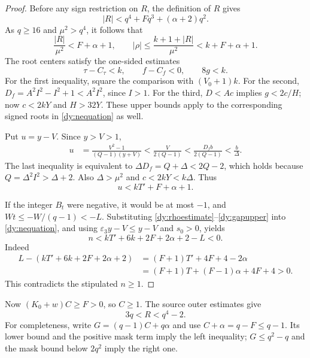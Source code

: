 \begin{proof}
Before any sign restriction on $R$, the definition of $R$ gives
\begin{equation}
 |R|<q^4+Fq^3+(\alpha+2)q^2.
 \label{dy:Rabsolute}
\end{equation}
As $q\ge16$ and $\mu^2>q^4$, it follows that
\begin{equation}
 \frac{|R|}{\mu^2}<F+\alpha+1,\qquad
 |\rho|\le\frac{k+1+|R|}{\mu^2}<k+F+\alpha+1.
 \label{dy:rhoestimate}
\end{equation}
The root centers satisfy the one-sided estimates
\begin{equation}
 \tau-C_\tau<k,\qquad f-C_f<0,\qquad 8g<k.
 \label{dy:rootupper}
\end{equation}
For the first inequality, square the comparison with $(V_0+1)k$.
For the second, $D_f=A^2I^2-I^2+1<A^2I^2$, since $I>1$.
For the third, $D<Ac$ implies $g<2c/H$; now $c<2kY$ and $H>32Y$.
These upper bounds apply to the corresponding signed roots in
\eqref{dy:nequation} as well.

Put $u=y-V$.  Since $y>V>1$,
\begin{align*}
 u&=\frac{V^2-1}{(Q-1)(y+V)}
       <\frac{V}{2(Q-1)}
       <\frac{D_fb}{2(Q-1)}<\frac b\Delta.
\end{align*}
The last inequality is equivalent to
$\Delta D_f=Q+\Delta<2Q-2$, which holds because
$Q=\Delta^2I^2>\Delta+2$.  Also $\Delta>\mu^2$ and
$c<2kY<k\Delta$.  Thus
\begin{equation}
 u<kT'+F+\alpha+1.
 \label{dy:gapupper}
\end{equation}

If the integer $B_t$ were negative, it would be at most $-1$, and
$Wt\le-W/(q-1)<-L$.  Substituting
\eqref{dy:rhoestimate}--\eqref{dy:gapupper} into
\eqref{dy:nequation}, and using
$\varepsilon_3y-V\le y-V$ and $s_0>0$, yields
\[
 n<kT'+6k+2F+2\alpha+2-L<0.
\]
Indeed
\begin{align*}
 L-(kT'+6k+2F+2\alpha+2)
  &=(F+1)T'+4F+4-2\alpha\\
  &=(F+1)T+(F-1)\alpha+4F+4>0.
\end{align*}
This contradicts the stipulated $n\ge1$.
\end{proof}

Now $(K_0+w)C\ge F>0$, so $C\ge1$.  The source outer estimates give
\begin{equation}
 3q<R<q^4-2.
 \label{dy:Router}
\end{equation}
For completeness, write
$G=(q-1)C+q\alpha$ and use $C+\alpha=q-F\le q-1$.
Its lower bound and the positive mask term imply the left inequality;
$G\le q^2-q$ and the mask bound below $2q^2$ imply the right one.

